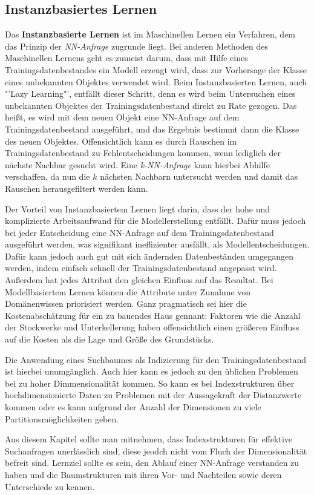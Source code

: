 \subsection{Instanzbasiertes Lernen}
Das \textbf{Instanzbasierte Lernen} ist im Maschinellen Lernen ein Verfahren, dem
das Prinzip der \textit{NN-Anfrage} zugrunde liegt. Bei anderen Methoden des
Maschinellen Lernens geht es zumeist darum, dass mit Hilfe eines Trainingsdatenbestandes
ein Modell erzeugt wird, dass zur Vorhersage der Klasse eines unbekannten Objektes
verwendet wird. Beim Instanzbasierten Lernen, auch "'Lazy Learning"', entfällt
dieser Schritt, denn es wird beim Untersuchen eines unbekannten Objektes der
Trainingsdatenbestand direkt zu Rate gezogen. Das heißt, es wird mit dem neuen
Objekt eine NN-Anfrage auf dem Trainingsdatenbestand ausgeführt, und das Ergebnis
bestimmt dann die Klasse des neuen Objektes. Offensichtlich kann es durch Rauschen im
Trainingsdatenbestand zu Fehlentscheidungen kommen, wenn lediglich der nächste Nachbar
gesucht wird. Eine \textit{k-NN-Anfrage} kann hierbei Abhilfe verschaffen, da nun die
\(k\) nächsten Nachbarn untersucht werden und damit das Rauschen herausgefiltert werden
kann.

Der Vorteil von Instanzbasiertem Lernen liegt darin, dass der hohe und komplizierte
Arbeitsaufwand für die Modellerstellung entfällt. Dafür muss jedoch bei jeder
Entscheidung eine NN-Anfrage auf dem Trainingsdatenbestand ausgeführt werden, was
signifikant ineffizienter ausfällt, als Modellentscheidungen. Dafür kann jedoch auch
gut mit sich ändernden Datenbeständen umgegangen werden, indem einfach schnell der
Trainingsdatenbestand angepasst wird. Außerdem hat jedes Attribut den gleichen Einfluss
auf das Resultat. Bei Modellbasiertem Lernen können die Attribute unter Zunahme
von Domänenwissen priorisiert werden. Ganz pragmatisch sei hier die Kostenabschätzung
für ein zu bauendes Haus gennant: Faktoren wie die Anzahl der Stockwerke und 
Unterkellerung haben offensichtlich einen größeren Einfluss auf die Kosten als
die Lage und Größe des Grundstücks.

Die Anwendung eines Suchbaumes als Indizierung für den Trainingsdatenbestand ist
hierbei unumgänglich. Auch hier kann es jedoch zu den üblichen Problemen bei zu
hoher Dimmensionalität kommen. So kann es bei Indexstrukturen über hochdimensionierte
Daten zu Problemen mit der Aussagekraft der Distanzwerte kommen oder es kann aufgrund
der Anzahl der Dimensionen zu viele Partitionsmöglichkeiten geben.

Aus diesem Kapitel sollte man mitnehmen, dass Indexstrukturen für effektive
Suchanfragen unerlässlich sind, diese jeodch nicht vom Fluch der Dimensionalität
befreit sind. Lernziel sollte es sein, den Ablauf einer NN-Anfrage verstanden zu
haben und die Baumstrukturen mit ihren Vor- und Nachteilen sowie deren Unterschiede
zu kennen.

